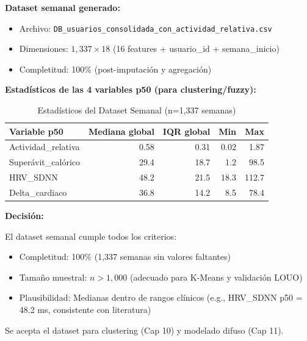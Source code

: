 \documentclass[12pt,letterpaper,twoside]{report}
\begin{document}
\begin{calculobox}
\textbf{Dataset semanal generado:}

\begin{itemize}[noitemsep]
    \item Archivo: \texttt{DB\_usuarios\_consolidada\_con\_actividad\_relativa.csv}
    \item Dimensiones: $1,337 \times 18$ (16 features + usuario\_id + semana\_inicio)
    \item Completitud: 100\% (post-imputación y agregación)
\end{itemize}

\textbf{Estadísticos de las 4 variables p50 (para clustering/fuzzy):}

\begin{table}[H]
\centering
\begin{tabular}{@{}lrrrr@{}}
\toprule
\textbf{Variable p50} & \textbf{Mediana global} & \textbf{IQR global} & \textbf{Min} & \textbf{Max} \\
\midrule
Actividad\_relativa     & 0.58 & 0.31 & 0.02 & 1.87 \\
Superávit\_calórico     & 29.4 & 18.7 & 1.2  & 98.5 \\
HRV\_SDNN               & 48.2 & 21.5 & 18.3 & 112.7 \\
Delta\_cardiaco         & 36.8 & 14.2 & 8.5  & 78.4 \\
\bottomrule
\end{tabular}
\caption{Estadísticos del Dataset Semanal (n=1,337 semanas)}
\label{tab:weekly_stats}
\end{table}
\end{calculobox}

\begin{decisionbox}
\textbf{Decisión:}

El dataset semanal cumple todos los criterios:
\begin{itemize}[noitemsep]
    \item Completitud: 100\% (1,337 semanas sin valores faltantes)
    \item Tamaño muestral: $n > 1,000$ (adecuado para K-Means y validación LOUO)
    \item Plausibilidad: Medianas dentro de rangos clínicos (e.g., HRV\_SDNN p50 = 48.2 ms, consistente con literatura)
\end{itemize}

Se acepta el dataset para clustering (Cap 10) y modelado difuso (Cap 11).
\end{decisionbox}
\end{document}
